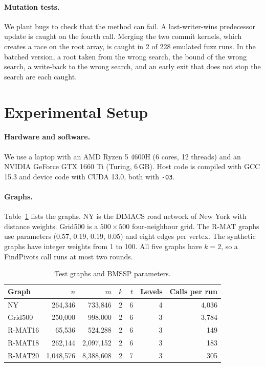 \documentclass[conference]{IEEEtran}
\begin{document}
\paragraph{Mutation tests.} We plant bugs to check that the method can fail. A last-writer-wins predecessor update is
caught on the fourth call. Merging the two commit kernels, which creates a race on the root array, is caught in 2 of 228
emulated fuzz runs. In the batched version, a root taken from the wrong search, the bound of the wrong search, a
write-back to the wrong search, and an early exit that does not stop the search are each caught.

\section{Experimental Setup}

\paragraph{Hardware and software.} We use a laptop with an AMD Ryzen 5 4600H (6 cores, 12 threads) and an NVIDIA
GeForce GTX 1660 Ti (Turing, 6\,GB). Host code is compiled with GCC 15.3 and device code with CUDA 13.0, both with
\texttt{-O3}.

\paragraph{Graphs.} Table~\ref{tab:graphs} lists the graphs. NY is the DIMACS road network of New York with distance
weights. Grid500 is a $500\times 500$ four-neighbour grid. The R-MAT graphs use parameters (0.57, 0.19, 0.19, 0.05)
and eight edges per vertex. The synthetic graphs have integer weights from 1 to 100. All five graphs have $k = 2$, so a
FindPivots call runs at most two rounds.

\begin{table}[t]
\centering
\footnotesize\setlength{\tabcolsep}{3pt}
\caption{Test graphs and BMSSP parameters.}
\label{tab:graphs}
\begin{tabular}{lrrrrrr}
\toprule
Graph & $n$ & $m$ & $k$ & $t$ & Levels & Calls per run \\
\midrule
NY & 264{,}346 & 733{,}846 & 2 & 6 & 4 & 4{,}036 \\
Grid500 & 250{,}000 & 998{,}000 & 2 & 6 & 3 & 3{,}784 \\
R-MAT16 & 65{,}536 & 524{,}288 & 2 & 6 & 3 & 149 \\
R-MAT18 & 262{,}144 & 2{,}097{,}152 & 2 & 6 & 3 & 183 \\
R-MAT20 & 1{,}048{,}576 & 8{,}388{,}608 & 2 & 7 & 3 & 305 \\
\bottomrule
\end{tabular}
\end{table}
\end{document}

